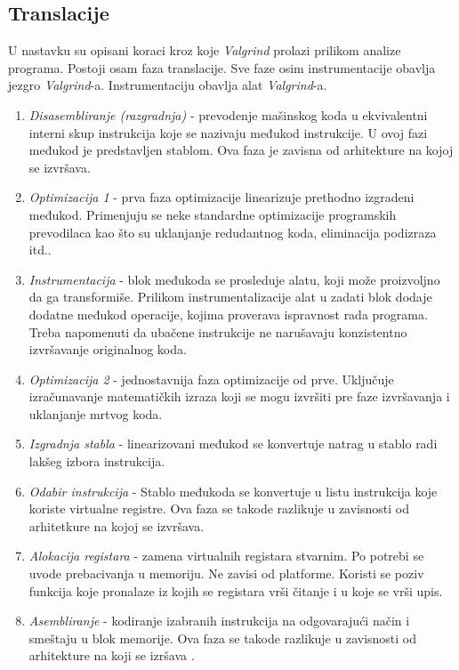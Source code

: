 \documentclass[12pt,oneside]{memoir}
\theoremstyle{plain}
\theoremstyle{definition}
\begin{document}
\subsection*{Translacije}
U nastavku su opisani koraci kroz koje \textit{Valgrind} prolazi prilikom analize programa. Postoji osam faza translacije. Sve faze osim instrumentacije obavlja jezgro \textit{Valgrind}-a. Instrumentaciju obavlja alat \textit{Valgrind}-a.
\begin{enumerate}
\item \textit{Disasembliranje (razgradnja)} - prevodenje mašinskog koda u ekvivalentni interni skup instrukcija koje se nazivaju međukod instrukcije. U ovoj fazi međukod je predstavljen stablom. Ova faza je zavisna od arhitekture na kojoj se izvršava. 
\item \textit{Optimizacija 1} - prva faza optimizacije linearizuje prethodno izgradeni međukod. Primenjuju se neke standardne optimizacije programskih prevodilaca kao što  su uklanjanje redudantnog koda, eliminacija podizraza itd..
\item \textit{Instrumentacija} - blok međukoda se prosleduje alatu, koji može proizvoljno da ga transformiše. Prilikom instrumentalizacije alat u zadati blok dodaje dodatne međukod operacije, kojima proverava ispravnost rada programa. Treba napomenuti da ubačene instrukcije ne narušavaju konzistentno izvršavanje originalnog koda. 
\item \textit{Optimizacija 2} - jednostavnija faza optimizacije od prve. Uključuje izračunavanje matematičkih izraza koji se mogu izvršiti pre faze izvršavanja i uklanjanje mrtvog koda.
\item \textit{Izgradnja stabla} - linearizovani međukod se konvertuje natrag u stablo radi lakšeg izbora instrukcija. 
\item \textit{Odabir instrukcija} - Stablo međukoda se konvertuje u listu instrukcija koje koriste virtualne registre. Ova faza se takode razlikuje u zavisnosti od arhitetkure na kojoj se izvršava. 
\item \textit{Alokacija registara} - zamena virtualnih registara stvarnim. Po potrebi se uvode prebacivanja u memoriju. Ne zavisi od platforme. Koristi se poziv funkcija koje pronalaze iz kojih se registara vrši čitanje i u koje se vrši upis.
\item \textit{Asembliranje} - kodiranje izabranih instrukcija na odgovarajući način i smeštaju u blok memorije. Ova faza se takode razlikuje u zavisnosti od arhitekture na koji se izršava \cite{03DinamickaAnaliza} \cite{AKMSc}. 
\end{enumerate}
\end{document}
